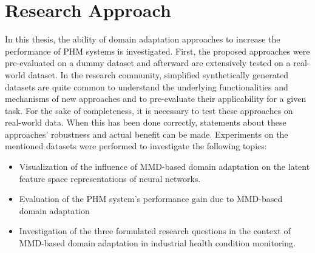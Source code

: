 \section{Research Approach}
In this thesis, the ability of domain adaptation approaches to increase the performance of PHM systems is investigated. First, the proposed approaches were pre-evaluated on a dummy dataset and afterward are extensively tested on a real-world dataset. In the research community, simplified synthetically generated datasets are quite common to understand the underlying functionalities and mechanisms of new approaches and to pre-evaluate their applicability for a given task. For the sake of completeness, it is necessary to test these approaches on real-world data. When this has been done correctly, statements about these approaches' robustness and actual benefit can be made. Experiments on the mentioned datasets were performed to investigate the following topics:
\begin{itemize}
    \item  Visualization of the influence of MMD-based domain adaptation on the latent feature space representations of neural networks.
    \item Evaluation of the PHM system's performance gain due to MMD-based domain adaptation
    \item Investigation of the three formulated research questions in the context of MMD-based domain adaptation in industrial health condition monitoring.
\end{itemize}

